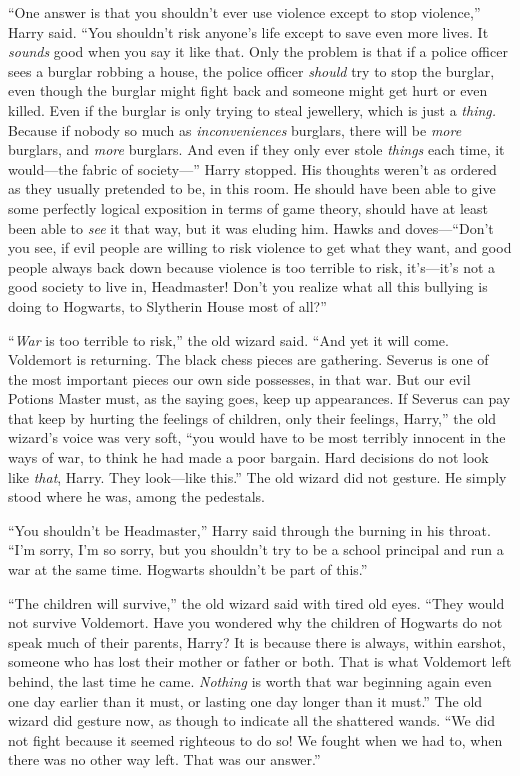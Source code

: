 “One answer is that you shouldn’t ever use violence except to stop violence,” Harry said. “You shouldn’t risk anyone’s life except to save even more lives. It \emph{sounds} good when you say it like that. Only the problem is that if a police officer sees a burglar robbing a house, the police officer \emph{should} try to stop the burglar, even though the burglar might fight back and someone might get hurt or even killed. Even if the burglar is only trying to steal jewellery, which is just a \emph{thing.} Because if nobody so much as \emph{inconveniences} burglars, there will be \emph{more} burglars, and \emph{more} burglars. And even if they only ever stole \emph{things} each time, it would—the fabric of society—” Harry stopped. His thoughts weren’t as ordered as they usually pretended to be, in this room. He should have been able to give some perfectly logical exposition in terms of game theory, should have at least been able to \emph{see} it that way, but it was eluding him. Hawks and doves—“Don’t you see, if evil people are willing to risk violence to get what they want, and good people always back down because violence is too terrible to risk, it’s—it’s not a good society to live in, Headmaster! Don’t you realize what all this bullying is doing to Hogwarts, to Slytherin House most of all?”

“\emph{War} is too terrible to risk,” the old wizard said. “And yet it will come. Voldemort is returning. The black chess pieces are gathering. Severus is one of the most important pieces our own side possesses, in that war. But our evil Potions Master must, as the saying goes, keep up appearances. If Severus can pay that keep by hurting the feelings of children, only their feelings, Harry,” the old wizard’s voice was very soft, “you would have to be most terribly innocent in the ways of war, to think he had made a poor bargain. Hard decisions do not look like \emph{that}, Harry. They look—like this.” The old wizard did not gesture. He simply stood where he was, among the pedestals.

“You shouldn’t be Headmaster,” Harry said through the burning in his throat. “I’m sorry, I’m so sorry, but you shouldn’t try to be a school principal and run a war at the same time. Hogwarts shouldn’t be part of this.”

“The children will survive,” the old wizard said with tired old eyes. “They would not survive Voldemort. Have you wondered why the children of Hogwarts do not speak much of their parents, Harry? It is because there is always, within earshot, someone who has lost their mother or father or both. That is what Voldemort left behind, the last time he came. \emph{Nothing} is worth that war beginning again even one day earlier than it must, or lasting one day longer than it must.” The old wizard did gesture now, as though to indicate all the shattered wands. “We did not fight because it seemed righteous to do so! We fought when we had to, when there was no other way left. That was our answer.”

